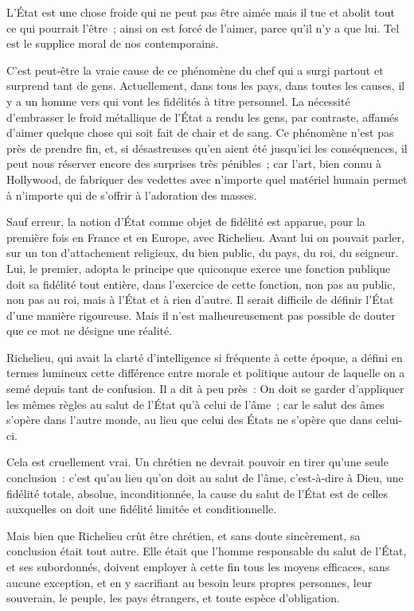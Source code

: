\documentclass[french,twoside]{book} %
\begin{document}
L'État est une chose froide qui ne peut pas être aimée mais il tue et abolit tout ce qui pourrait l'être ; ainsi on est forcé de l'aimer, parce qu'il n'y a que lui. Tel est le supplice moral de nos contemporains.\par
C'est peut-être la vraie cause de ce phénomène du chef qui a surgi partout et surprend tant de gens. Actuellement, dans tous les pays, dans toutes les causes, il y a un homme vers qui vont les fidélités à titre personnel. La nécessité d'embrasser le froid métallique de l'État a rendu les gens, par contraste, affamés d'aimer quelque chose qui soit fait de chair et de sang. Ce phénomène n'est pas près de prendre fin, et, si désastreuses qu'en aient été jusqu'ici les conséquences, il peut nous réserver encore des surprises très pénibles ; car l'art, bien connu à Hollywood, de fabriquer des vedettes avec n'importe quel matériel humain permet à n'importe qui de s'offrir à l'adoration des masses.\par
Sauf erreur, la notion d'État comme objet de fidélité est apparue, pour la première fois en France et en Europe, avec Richelieu. Avant lui on pouvait parler, sur un ton d'attachement religieux, du bien public, du pays, du roi, du seigneur. Lui, le premier, adopta le principe que quiconque exerce une fonction publique doit sa fidélité tout entière, dans l'exercice de cette fonction, non pas au public, non pas au roi, mais à l'État et à rien d'autre. Il serait difficile de définir l'État d'une manière rigoureuse. Mais il n'est malheureusement pas possible de douter que ce mot ne désigne une réalité.\par
Richelieu, qui avait la clarté d'intelligence si fréquente à cette époque, a défini en termes lumineux cette différence entre morale et politique autour de laquelle on a semé depuis tant de confusion. Il a dit à peu près : On doit se garder d'appliquer les mêmes règles au salut de l'État qu'à celui de l'âme ; car le salut des âmes s'opère dans l'autre monde, au lieu que celui des États ne s'opère que dans celui-ci.\par
Cela est cruellement vrai. Un chrétien ne devrait pouvoir en tirer qu'une seule conclusion : c'est qu'au lieu qu'on doit au salut de l'âme, c'est-à-dire à Dieu, une fidélité totale, absolue, inconditionnée, la cause du salut de l'État est de celles auxquelles on doit une fidélité limitée et conditionnelle.\par
Mais bien que Richelieu crût être chrétien, et sans doute sincèrement, sa conclusion était tout autre. Elle était que l'homme responsable du salut de l'État, et ses subordonnés, doivent employer à cette fin tous les moyens efficaces, sans aucune exception, et en y sacrifiant au besoin leurs propres personnes, leur souverain, le peuple, les pays étrangers, et toute espèce d'obligation.\par
\end{document}

